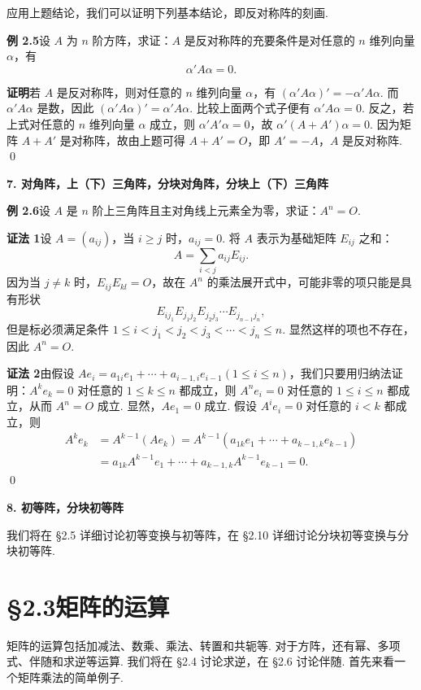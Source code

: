 \documentclass[UTF8,12pt,a4paper,fontset=fandol]{ctexart}
\begin{document}
应用上题结论，我们可以证明下列基本结论，即反对称阵的刻画.

\noindent\textbf{例 2.5}\quad 设 $A$ 为 $n$ 阶方阵，求证：$A$ 是反对称阵的充要条件是对任意的 $n$ 维列向量 $\alpha$，有
\[
\alpha' A\alpha=0.
\]

\noindent\textbf{证明}\quad 若 $A$ 是反对称阵，则对任意的 $n$ 维列向量 $\alpha$，有 $(\alpha'A\alpha)'=-\alpha'A\alpha$. 而 $\alpha'A\alpha$ 是数，因此 $(\alpha'A\alpha)'=\alpha'A\alpha$. 比较上面两个式子便有 $\alpha'A\alpha=0$. 反之，若
上式对任意的 $n$ 维列向量 $\alpha$ 成立，则 $\alpha'A'\alpha=0$，故 $\alpha'(A+A')\alpha=0$. 因为矩阵 $A+A'$ 是对称阵，故由上题可得 $A+A'=O$，即 $A'=-A$，$A$ 是反对称阵. \qed

\noindent\textbf{7. 对角阵，上（下）三角阵，分块对角阵，分块上（下）三角阵}

\noindent\textbf{例 2.6}\quad 设 $A$ 是 $n$ 阶上三角阵且主对角线上元素全为零，求证：$A^n=O$.

\noindent\textbf{证法 1}\quad 设 $A=(a_{ij})$，当 $i\ge j$ 时，$a_{ij}=0$. 将 $A$ 表示为基础矩阵 $E_{ij}$ 之和：
\[
A=\sum_{i<j}a_{ij}E_{ij}.
\]
因为当 $j\ne k$ 时，$E_{ij}E_{kl}=O$，故在 $A^n$ 的乘法展开式中，可能非零的项只能是具有形状
\[
E_{ij_1}E_{j_1j_2}E_{j_2j_3}\cdots E_{j_{n-1}j_n},
\]
但是标必须满足条件 $1\le i<j_1<j_2<j_3<\cdots<j_n\le n$. 显然这样的项也不存在，因此 $A^n=O$.

\noindent\textbf{证法 2}\quad 由假设 $Ae_i=a_{1i}e_1+\cdots+a_{i-1,i}e_{i-1}(1\le i\le n)$，我们只要用归纳法证明：$A^ke_k=0$ 对任意的 $1\le k\le n$ 都成立，则 $A^ne_i=0$ 对任意的 $1\le i\le n$ 都成立，从而 $A^n=O$ 成立. 显然，$Ae_1=0$ 成立. 假设 $A^ie_i=0$ 对任意的 $i<k$ 都成立，则
\[
\begin{aligned}
A^ke_k
&=A^{k-1}(Ae_k)=A^{k-1}(a_{1k}e_1+\cdots+a_{k-1,k}e_{k-1})\\
&=a_{1k}A^{k-1}e_1+\cdots+a_{k-1,k}A^{k-1}e_{k-1}=0.
\end{aligned}
\]
\qed

\noindent\textbf{8. 初等阵，分块初等阵}

我们将在 §2.5 详细讨论初等变换与初等阵，在 §2.10 详细讨论分块初等变换与分块初等阵.

\section*{§2.3\quad 矩阵的运算}

矩阵的运算包括加减法、数乘、乘法、转置和共轭等. 对于方阵，还有幂、多项式、伴随和求逆等运算. 我们将在 §2.4 讨论求逆，在 §2.6 讨论伴随. 首先来看一个矩阵乘法的简单例子.
\end{document}
